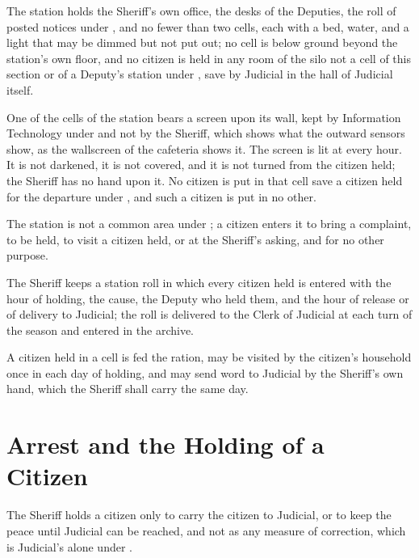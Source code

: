 \begin{clauses}
\item The station holds the Sheriff's own office, the desks of the Deputies, the roll of posted notices under , and no fewer than two cells, each with a bed, water, and a light that may be dimmed but not put out; no cell is below ground beyond the station's own floor, and no citizen is held in any room of the silo not a cell of this section or of a Deputy's station under , save by Judicial in the hall of Judicial itself.
\item One of the cells of the station bears a screen upon its wall, kept by Information Technology under  and not by the Sheriff, which shows what the outward sensors show, as the wallscreen of the cafeteria shows it. The screen is lit at every hour. It is not darkened, it is not covered, and it is not turned from the citizen held; the Sheriff has no hand upon it. No citizen is put in that cell save a citizen held for the departure under , and such a citizen is put in no other.
\item The station is not a common area under ; a citizen enters it to bring a complaint, to be held, to visit a citizen held, or at the Sheriff's asking, and for no other purpose.
\item The Sheriff keeps a station roll in which every citizen held is entered with the hour of holding, the cause, the Deputy who held them, and the hour of release or of delivery to Judicial; the roll is delivered to the Clerk of Judicial at each turn of the season and entered in the archive.
\item A citizen held in a cell is fed the ration, may be visited by the citizen's household once in each day of holding, and may send word to Judicial by the Sheriff's own hand, which the Sheriff shall carry the same day.
\end{clauses}

\section{Arrest and the Holding of a Citizen}
\label{sec:sheriff:arrest-and-the-holding-of-a-citizen}

The Sheriff holds a citizen only to carry the citizen to Judicial, or to keep the peace until Judicial can be reached, and not as any measure of correction, which is Judicial's alone under .

